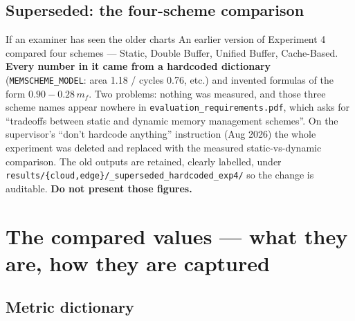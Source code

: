 \documentclass[11pt,a4paper]{article}
\newcommand{\file}[1]{\texttt{\small #1}}
\begin{document}
\subsection{Superseded: the four-scheme comparison}
\label{sec:superseded}

\begin{warnbox}{If an examiner has seen the older charts}
An earlier version of Experiment 4 compared four schemes --- Static, Double
Buffer, Unified Buffer, Cache-Based. \textbf{Every number in it came from a
hardcoded dictionary} (\file{MEMSCHEME\_MODEL}: area 1.18 / cycles 0.76, etc.)
and invented formulas of the form $0.90 - 0.28\,m_f$. Two problems: nothing was
measured, and those three scheme names appear nowhere in
\file{evaluation\_requirements.pdf}, which asks for ``tradeoffs between static
and dynamic memory management schemes''. On the supervisor's ``don't hardcode
anything'' instruction (Aug 2026) the whole experiment was deleted and replaced
with the measured static-vs-dynamic comparison. The old outputs are retained,
clearly labelled, under \file{results/\{cloud,edge\}/\_superseded\_hardcoded\_exp4/}
so the change is auditable. \textbf{Do not present those figures.}
\end{warnbox}

\section{The compared values --- what they are, how they are captured}

\subsection{Metric dictionary}
\end{document}
